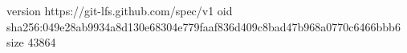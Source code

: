 version https://git-lfs.github.com/spec/v1
oid sha256:049e28ab9934a8d130e68304e779faaf836d409c8bad47b968a0770c6466bbb6
size 43864
